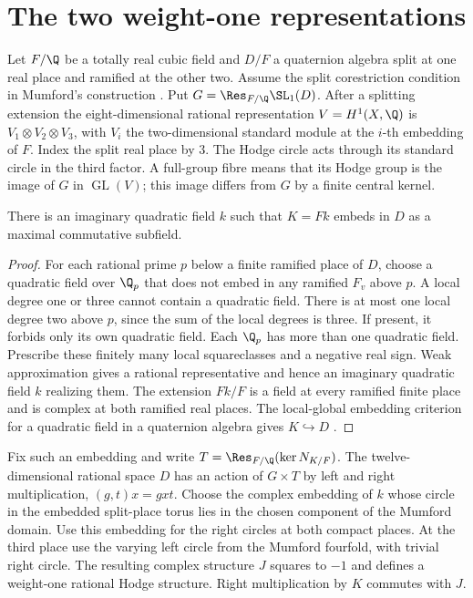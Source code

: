 \section{The two weight-one representations}\label{v7:sec:setup}

Let \(F/\Q\) be a totally real cubic field and \(D/F\) a quaternion algebra split at one real place and ramified at the other two. Assume the split corestriction condition in Mumford's construction \cite{Mum69,vG00}. Put \(G=\Res_{F/\Q}\SL_1(D)\). After a splitting extension the eight-dimensional rational representation \(V=H^1(X,\Q)\) is \(V_1\otimes V_2\otimes V_3\), with \(V_i\) the two-dimensional standard module at the \(i\)-th embedding of \(F\). Index the split real place by 3. The Hodge circle acts through its standard circle in the third factor. A full-group fibre means that its Hodge group is the image of \(G\) in \(\operatorname{GL}(V)\); this image differs from \(G\) by a finite central kernel.

\begin{lemma}\label{v7:lem:field}
There is an imaginary quadratic field \(k\) such that \(K=Fk\) embeds in \(D\) as a maximal commutative subfield.
\end{lemma}
\begin{proof}
For each rational prime \(p\) below a finite ramified place of \(D\), choose a quadratic field over \(\Q_p\) that does not embed in any ramified \(F_v\) above \(p\). A local degree one or three cannot contain a quadratic field. There is at most one local degree two above \(p\), since the sum of the local degrees is three. If present, it forbids only its own quadratic field. Each \(\Q_p\) has more than one quadratic field. Prescribe these finitely many local squareclasses and a negative real sign. Weak approximation gives a rational representative and hence an imaginary quadratic field \(k\) realizing them. The extension \(Fk/F\) is a field at every ramified finite place and is complex at both ramified real places. The local-global embedding criterion for a quadratic field in a quaternion algebra gives \(K\hookrightarrow D\) \cite{Reiner75}.
\end{proof}

Fix such an embedding and write \(T=\Res_{F/\Q}(\ker N_{K/F})\). The twelve-dimensional rational space \(D\) has an action of \(G\times T\) by left and right multiplication, \((g,t)x=gxt\). Choose the complex embedding of \(k\) whose circle in the embedded split-place torus lies in the chosen component of the Mumford domain. Use this embedding for the right circles at both compact places. At the third place use the varying left circle from the Mumford fourfold, with trivial right circle. The resulting complex structure \(J\) squares to \(-1\) and defines a weight-one rational Hodge structure. Right multiplication by \(K\) commutes with \(J\).


